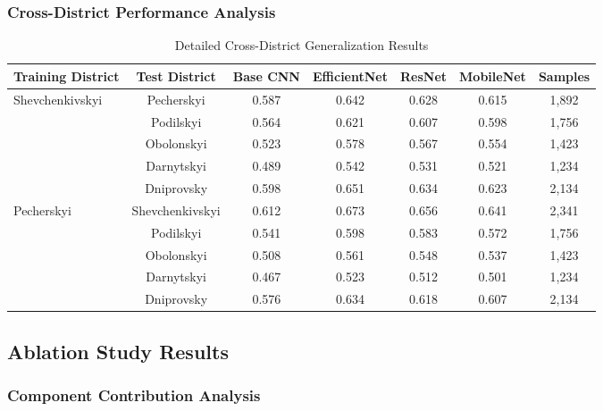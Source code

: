 \subsubsection{Cross-District Performance Analysis}

\begin{table}[H]
\centering
\caption{Detailed Cross-District Generalization Results}
\begin{tabular}{|l|c|c|c|c|c|c|}
\hline
\textbf{Training District} & \textbf{Test District} & \textbf{Base CNN} & \textbf{EfficientNet} & \textbf{ResNet} & \textbf{MobileNet} & \textbf{Samples} \\
\hline
\multirow{5}{*}{Shevchenkivskyi} & Pecherskyi & 0.587 & 0.642 & 0.628 & 0.615 & 1,892 \\
& Podilskyi & 0.564 & 0.621 & 0.607 & 0.598 & 1,756 \\
& Obolonskyi & 0.523 & 0.578 & 0.567 & 0.554 & 1,423 \\
& Darnytskyi & 0.489 & 0.542 & 0.531 & 0.521 & 1,234 \\
& Dniprovsky & 0.598 & 0.651 & 0.634 & 0.623 & 2,134 \\
\hline
\multirow{5}{*}{Pecherskyi} & Shevchenkivskyi & 0.612 & 0.673 & 0.656 & 0.641 & 2,341 \\
& Podilskyi & 0.541 & 0.598 & 0.583 & 0.572 & 1,756 \\
& Obolonskyi & 0.508 & 0.561 & 0.548 & 0.537 & 1,423 \\
& Darnytskyi & 0.467 & 0.523 & 0.512 & 0.501 & 1,234 \\
& Dniprovsky & 0.576 & 0.634 & 0.618 & 0.607 & 2,134 \\
\hline
\end{tabular}
\end{table}

\subsection{Ablation Study Results}

\subsubsection{Component Contribution Analysis}

